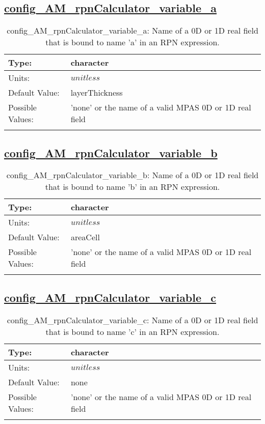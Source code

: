 \subsection[config\_AM\_rpnCalculator\_variable\_a]{\hyperref[sec:nm_tab_AM_rpnCalculator]{config\_AM\_rpnCalculator\_variable\_a}}
\label{subsec:nm_sec_config_AM_rpnCalculator_variable_a}
\begin{center}
\begin{longtable}{| p{2.0in} || p{4.0in} |}
    \hline
    Type: & character \\
    \hline
    Units: & $unitless$ \\
    \hline
    Default Value: & layerThickness \\
    \hline
    Possible Values: & 'none' or the name of a valid MPAS 0D or 1D real field \\
    \hline
    \caption{config\_AM\_rpnCalculator\_variable\_a: Name of a 0D or 1D real field that is bound to name 'a' in an RPN expression.}
\end{longtable}
\end{center}
\subsection[config\_AM\_rpnCalculator\_variable\_b]{\hyperref[sec:nm_tab_AM_rpnCalculator]{config\_AM\_rpnCalculator\_variable\_b}}
\label{subsec:nm_sec_config_AM_rpnCalculator_variable_b}
\begin{center}
\begin{longtable}{| p{2.0in} || p{4.0in} |}
    \hline
    Type: & character \\
    \hline
    Units: & $unitless$ \\
    \hline
    Default Value: & areaCell \\
    \hline
    Possible Values: & 'none' or the name of a valid MPAS 0D or 1D real field \\
    \hline
    \caption{config\_AM\_rpnCalculator\_variable\_b: Name of a 0D or 1D real field that is bound to name 'b' in an RPN expression.}
\end{longtable}
\end{center}
\subsection[config\_AM\_rpnCalculator\_variable\_c]{\hyperref[sec:nm_tab_AM_rpnCalculator]{config\_AM\_rpnCalculator\_variable\_c}}
\label{subsec:nm_sec_config_AM_rpnCalculator_variable_c}
\begin{center}
\begin{longtable}{| p{2.0in} || p{4.0in} |}
    \hline
    Type: & character \\
    \hline
    Units: & $unitless$ \\
    \hline
    Default Value: & none \\
    \hline
    Possible Values: & 'none' or the name of a valid MPAS 0D or 1D real field \\
    \hline
    \caption{config\_AM\_rpnCalculator\_variable\_c: Name of a 0D or 1D real field that is bound to name 'c' in an RPN expression.}
\end{longtable}
\end{center}
